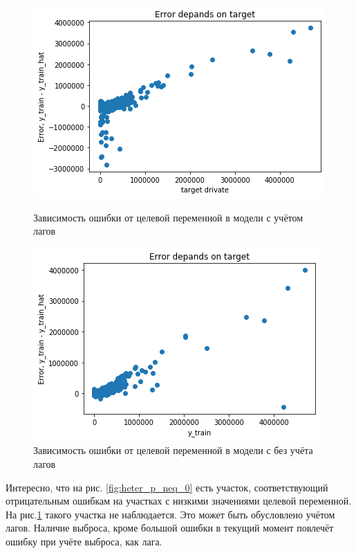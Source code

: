 \documentclass[14pt, a4paper]{extarticle}
\begin{document}
	\begin{figure}[!htb]
		\includegraphics[width=\linewidth]{Figures/heter_p_neq_0.png}
		\caption{Зависимость ошибки от целевой переменной в модели с учётом лагов}\label{fig:heter_p_neq_0}
		\endminipage\hfill
		\includegraphics[width=\linewidth]{Figures/heter_p_eq_0.png}
		\caption{Зависимость ошибки от целевой переменной в модели с без учёта лагов}\label{fig:heter_p_eq_0}
		\endminipage
	\end{figure}	

Интересно, что на рис. \ref{fig:heter_p_neq_0} есть участок, соответствующий отрицательным ошибкам на участках с низкими значениями целевой переменной.
На рис.\ref{fig:heter_p_eq_0} такого участка не наблюдается.
Это может быть обусловлено учётом лагов.
Наличие выброса, кроме большой ошибки в текущий момент повлечёт ошибку при учёте выброса, как лага. 
\end{document}
